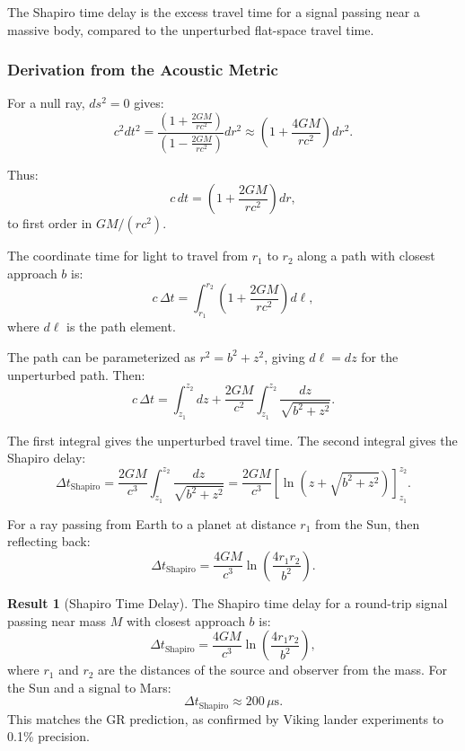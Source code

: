 \documentclass[11pt,a4paper]{article}
\theoremstyle{definition}
\newtheorem{result}{Result}[section]
\theoremstyle{remark}
\begin{document}
The Shapiro time delay is the excess travel time for a signal passing near a massive body, compared to the unperturbed flat-space travel time.

\subsubsection{Derivation from the Acoustic Metric}

For a null ray, $ds^2 = 0$ gives:
\begin{equation}
c^2 dt^2 = \frac{\left(1 + \frac{2GM}{rc^2}\right)}{\left(1 - \frac{2GM}{rc^2}\right)} dr^2 \approx \left(1 + \frac{4GM}{rc^2}\right) dr^2.
\end{equation}

Thus:
\begin{equation}
c \, dt = \left(1 + \frac{2GM}{rc^2}\right) dr,
\end{equation}
to first order in $GM/(rc^2)$.

The coordinate time for light to travel from $r_1$ to $r_2$ along a path with closest approach $b$ is:
\begin{equation}
c \, \Delta t = \int_{r_1}^{r_2} \left(1 + \frac{2GM}{rc^2}\right) d\ell,
\end{equation}
where $d\ell$ is the path element.

The path can be parameterized as $r^2 = b^2 + z^2$, giving $d\ell = dz$ for the unperturbed path. Then:
\begin{equation}
c \, \Delta t = \int_{z_1}^{z_2} dz + \frac{2GM}{c^2} \int_{z_1}^{z_2} \frac{dz}{\sqrt{b^2 + z^2}}.
\end{equation}

The first integral gives the unperturbed travel time. The second integral gives the Shapiro delay:
\begin{equation}
\Delta t_{\mathrm{Shapiro}} = \frac{2GM}{c^3} \int_{z_1}^{z_2} \frac{dz}{\sqrt{b^2 + z^2}} = \frac{2GM}{c^3} \left[\ln\left(z + \sqrt{b^2 + z^2}\right)\right]_{z_1}^{z_2}.
\end{equation}

For a ray passing from Earth to a planet at distance $r_1$ from the Sun, then reflecting back:
\begin{equation}
\Delta t_{\mathrm{Shapiro}} = \frac{4GM}{c^3} \ln\left(\frac{4r_1 r_2}{b^2}\right).
\end{equation}

\begin{result}[Shapiro Time Delay]
The Shapiro time delay for a round-trip signal passing near mass $M$ with closest approach $b$ is:
\begin{equation}
\boxed{\Delta t_{\mathrm{Shapiro}} = \frac{4GM}{c^3} \ln\left(\frac{4r_1 r_2}{b^2}\right),}
\end{equation}
where $r_1$ and $r_2$ are the distances of the source and observer from the mass. For the Sun and a signal to Mars:
\begin{equation}
\Delta t_{\mathrm{Shapiro}} \approx 200 \, \mu\text{s}.
\end{equation}
This matches the GR prediction, as confirmed by Viking lander experiments to 0.1\% precision.
\end{result}
\end{document}
